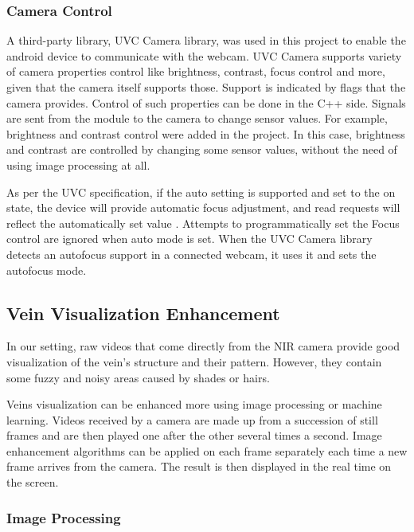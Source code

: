 \subsubsection{Camera Control}

A third-party library, UVC Camera library, was used in this project to enable the android device to communicate with the webcam. UVC Camera supports variety of camera properties control like brightness, contrast, focus control and more, given that the camera itself supports those. Support is indicated by flags that the camera provides. Control of such properties can be done in the C++ side. Signals are sent from the module to the camera to change sensor values. For example, brightness and contrast control were added in the project. In this case, brightness and contrast are controlled by changing some sensor values, without the need of using image processing at all.


As per the UVC specification, if the auto setting is supported and set to the on state, the device will provide automatic focus adjustment, and read requests will reflect the automatically set value \parencite{uvcCamera}. Attempts to programmatically set the Focus control are ignored when auto mode is set. When the UVC Camera library detects an autofocus support in a connected webcam, it uses it and sets the autofocus mode.



\subsection{Vein Visualization Enhancement}

In our setting, raw videos that come directly from the NIR camera provide good visualization of the vein’s structure and their pattern. However, they contain some fuzzy and noisy areas caused by shades or hairs.

Veins visualization can be enhanced more using image processing or machine learning.
Videos received by a camera are made up from a succession of still frames and are then played one after the other several times a second. Image enhancement algorithms can be applied on each frame separately each time a new frame arrives from the camera. The result is then displayed in the real time on the screen.


\subsubsection{Image Processing}



